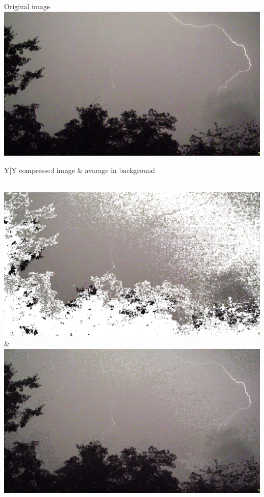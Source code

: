 \documentclass[10pt,a4paper,parskip=full]{scrartcl}
\begin{document}
	\centering Original image\\
	\includegraphics[width=\linewidth]{lightning_original}
	\begin{tabularx}{\linewidth}{Y|Y}
		compressed image & avarage in background\\ \hline
	
		\\
		
		\includegraphics[width=\linewidth]{90/lightning_neg}
	 &
	 	\includegraphics[width=\linewidth]{90/lightning_result}\\ \hline
	 	

\end{tabularx}
\end{document}
